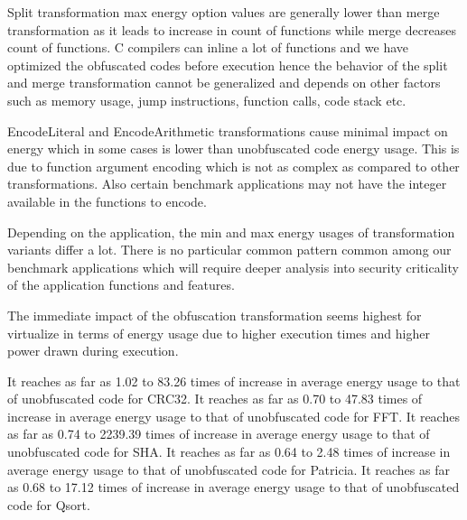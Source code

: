 
Split transformation max energy option values are generally lower than merge transformation as it leads to increase in count of functions while merge decreases count of functions. C compilers can inline a lot of functions and we have optimized the obfuscated codes before execution hence the behavior of the split and merge transformation cannot be generalized and depends on other factors such as memory usage, jump instructions, function calls,  code stack etc.


EncodeLiteral and EncodeArithmetic transformations cause minimal impact on energy which in some cases is lower than unobfuscated code energy usage. This is due to function argument encoding which is not as complex as compared to other transformations. Also certain benchmark applications may not have the integer available in the functions to encode.


Depending on the application, the min and max energy usages of transformation variants differ a lot. There is no particular  common pattern common among our benchmark applications which will require deeper analysis into security criticality of the application functions and features.

The immediate impact of the obfuscation transformation seems highest for virtualize in terms of energy usage due to higher execution times and higher power drawn during execution.

It reaches as far as 1.02 to 83.26 times of increase in average energy usage to that of unobfuscated code for CRC32. 
It reaches as far as 0.70 to 47.83 times of increase in average energy usage to that of unobfuscated code for FFT.
It reaches as far as 0.74 to 2239.39 times of increase in average energy usage to that of unobfuscated code for SHA.
It reaches as far as 0.64 to 2.48 times of increase in average energy usage to that of unobfuscated code for Patricia.
It reaches as far as 0.68 to 17.12 times of increase in average energy usage to that of unobfuscated code for Qsort.






